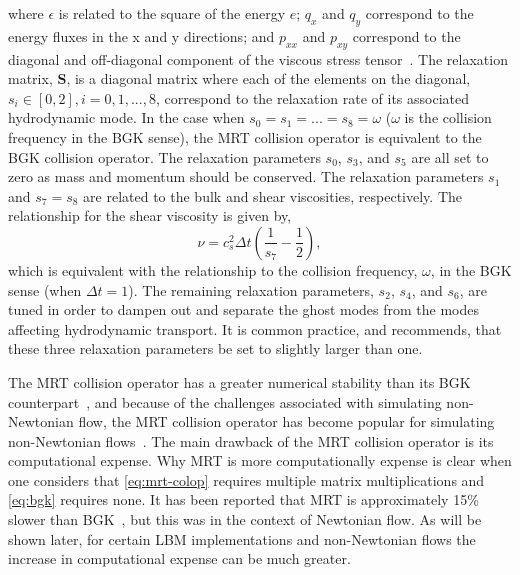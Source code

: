 \documentclass[pdftex,ms]{pittetd}
\newcommand{\relaxM}{\mathbf{S}}
\begin{document}
\noindent where $\epsilon$ is related to the square of the energy $e$; $q_x$ and $q_y$ correspond to the energy fluxes in the x and y directions; and $p_{xx}$ and $p_{xy}$ correspond to the diagonal and off-diagonal component of the viscous stress tensor~\cite{lallemand2000theory}. %
The relaxation matrix, $\relaxM$, is a diagonal matrix where each of the elements on the diagonal, $s_i \in [0, 2], i = 0, 1, ..., 8$, correspond to the relaxation rate of its associated hydrodynamic mode.
In the case when $s_0 = s_1 = ... = s_8 = \omega$ ($\omega$ is the collision frequency in the BGK sense), the MRT collision operator is equivalent to the BGK collision operator.
The relaxation parameters $s_0$, $s_3$, and $s_5$ are all set to zero as mass and momentum should be conserved.
The relaxation parameters $s_1$ and $s_7 = s_8$ are related to the bulk and shear viscosities, respectively.
The relationship for the shear viscosity is given by,
\begin{equation} \label{eq:mrt-s7}
\nu = c_s^2 \Delta t (\frac{1}{s_7} - \frac{1}{2}),
\end{equation}
\noindent which is equivalent with the relationship to the collision frequency, $\omega$, in the BGK sense (when $\Delta t = 1$).
The remaining relaxation parameters, $s_2$, $s_4$, and $s_6$, are tuned in order to dampen out and separate the ghost modes from the modes affecting hydrodynamic transport.
It is common practice, and \citet{lallemand2000theory} recommends, that these three relaxation parameters be set to slightly larger than one.

The MRT collision operator has a greater numerical stability than its BGK counterpart~\cite{lallemand2000theory,dellar2003incompressible,d2002multiple}, and because of the challenges associated with simulating non-Newtonian flow, the MRT collision operator has become popular for simulating non-Newtonian flows~\cite{chen2014simulations,fallah2012multiple,tang2011bingham,vikhansky2008lattice,chai2011multiple,grasinger2015simulation}.
The main drawback of the MRT collision operator is its computational expense.
Why MRT is more computationally expense is clear when one considers that \eqref{eq:mrt-colop} requires multiple matrix multiplications and \eqref{eq:bgk} requires none.
It has been reported that MRT is approximately 15\% slower than BGK~\cite{d2002multiple}, but this was in the context of Newtonian flow.
As will be shown later, for certain LBM implementations and non-Newtonian flows the increase in computational expense can be much greater.
\end{document}
